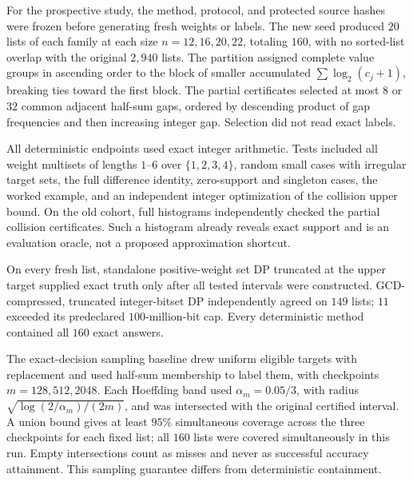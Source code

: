 \documentclass[10pt,english]{article}
\begin{document}
For the prospective study, the method, protocol, and protected source
hashes were frozen before generating fresh weights or labels. The new
seed produced \(20\) lists of each family at each size
\(n=12,16,20,22\), totaling \(160\), with no sorted-list overlap
with the original \(2{,}940\) lists. The partition assigned complete
value groups in ascending order to the block of smaller accumulated
\(\sum\log_2(c_j+1)\), breaking ties toward the first block.
The partial certificates selected at most \(8\) or \(32\) common
adjacent half-sum gaps, ordered by descending product of gap frequencies
and then increasing integer gap. Selection did not read exact labels.

All deterministic endpoints used exact integer arithmetic. Tests included
all weight multisets of lengths \(1\)--\(6\) over \(\{1,2,3,4\}\),
random small cases with irregular target sets, the full difference
identity, zero-support and singleton cases, the worked example, and an
independent integer optimization of the collision upper bound. On the
old cohort, full histograms independently checked the partial collision
certificates. Such a histogram already reveals exact support and is
an evaluation oracle, not a proposed approximation shortcut.

On every fresh list, standalone positive-weight set DP truncated at the
upper target supplied exact truth only after all tested intervals were
constructed. GCD-compressed, truncated integer-bitset DP independently
agreed on \(149\) lists; \(11\) exceeded its predeclared
\(100\)-million-bit cap. Every deterministic method contained all
\(160\) exact answers.

\begin{table}[htbp]
\centering
\caption{Fresh multi-size study. Width removal is the mean per-list
fractional reduction. Total time includes all preprocessing. Bitset
statistics use only its feasible subset; other rows use all \(160\) lists.}
\small

\end{table}

The exact-decision sampling baseline drew uniform eligible targets with
replacement and used half-sum membership to label them, with checkpoints
\(m=128,512,2048\). Each Hoeffding band used
\(\alpha_m=0.05/3\), with radius
\(\sqrt{\log(2/\alpha_m)/(2m)}\), and was intersected with the
original certified interval. A union bound gives at least \(95\%\)
simultaneous coverage across the three checkpoints for each fixed list;
all \(160\) lists were covered simultaneously in this run. Empty
intersections count as misses and never as successful accuracy attainment.
This sampling guarantee differs from deterministic containment.
\end{document}

